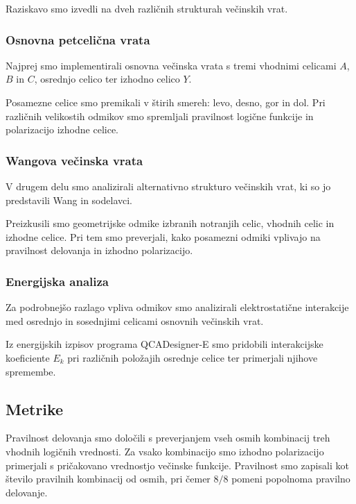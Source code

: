 \documentclass[12pt,a4paper]{article}
\begin{document}
Raziskavo smo izvedli na dveh različnih strukturah večinskih vrat.

\subsubsection{Osnovna petcelična vrata}

Najprej smo implementirali osnovna večinska vrata s tremi vhodnimi celicami $A$, $B$ in $C$, osrednjo celico ter izhodno celico $Y$.

Posamezne celice smo premikali v štirih smereh: levo, desno, gor in dol. Pri različnih velikostih
odmikov smo spremljali pravilnost logične funkcije in polarizacijo izhodne celice.

\subsubsection{Wangova večinska vrata}

V drugem delu smo analizirali alternativno strukturo večinskih vrat, ki so jo predstavili Wang in sodelavci.

Preizkusili smo geometrijske odmike izbranih notranjih celic, vhodnih celic in izhodne celice. Pri tem smo
preverjali, kako posamezni odmiki vplivajo na pravilnost delovanja in izhodno polarizacijo.

\subsubsection{Energijska analiza}

Za podrobnejšo razlago vpliva odmikov smo analizirali elektrostatične interakcije med osrednjo in sosednjimi celicami osnovnih večinskih vrat.

Iz energijskih izpisov programa QCADesigner-E smo pridobili interakcijske koeficiente $E_k$ pri različnih položajih osrednje celice ter primerjali njihove spremembe.


\subsection{Metrike}
\label{g18:sec:metrike}

Pravilnost delovanja smo določili s preverjanjem vseh osmih kombinacij treh vhodnih logičnih vrednosti.
Za vsako kombinacijo smo izhodno polarizacijo primerjali s pričakovano vrednostjo večinske funkcije.
Pravilnost smo zapisali kot število pravilnih kombinacij od osmih, pri čemer $8/8$ pomeni popolnoma pravilno delovanje.
\end{document}
